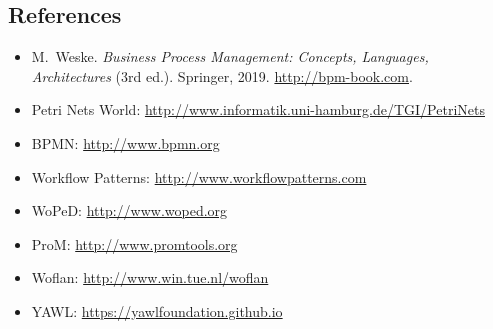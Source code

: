 \subsection*{References}

\begin{itemize}[leftmargin=*, labelsep=0.6em]
  \item M.~Weske. \emph{Business Process Management: Concepts, Languages, Architectures} (3rd ed.). Springer, 2019. \url{http://bpm-book.com}.
  \item Petri Nets World: \url{http://www.informatik.uni-hamburg.de/TGI/PetriNets}
  \item BPMN: \url{http://www.bpmn.org}
  \item Workflow Patterns: \url{http://www.workflowpatterns.com}
  \item WoPeD: \url{http://www.woped.org}
  \item ProM: \url{http://www.promtools.org}
  \item Woflan: \url{http://www.win.tue.nl/woflan}
  \item YAWL: \url{https://yawlfoundation.github.io}
\end{itemize}

